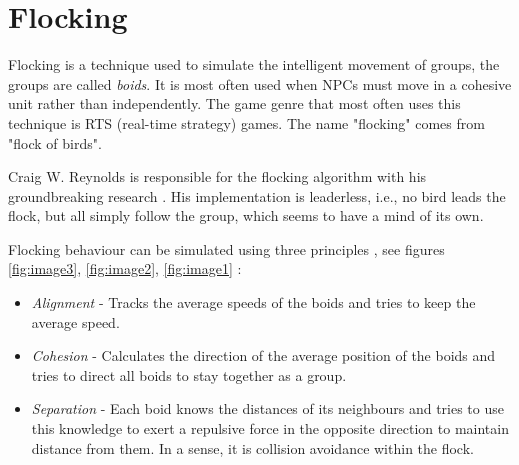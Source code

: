 \documentclass[a4paper,12pt,openright]{book}
\begin{document}
\section{Flocking}

Flocking is a technique used to simulate the intelligent movement of groups, the groups are called \emph{boids}. It is most often used when NPCs must move in a cohesive unit rather than independently. The game genre that most often uses this technique is RTS (real-time strategy) games. The name "flocking" comes from "flock of birds".

Craig W. Reynolds is responsible for the flocking algorithm with his groundbreaking research \cite{FlocksReynolds}. His implementation is leaderless, i.e., no bird leads the flock, but all simply follow the group, which seems to have a mind of its own.

Flocking behaviour can be simulated using three principles \cite{FlockingBehaviour}, see figures \ref{fig:image3}, \ref{fig:image2}, \ref{fig:image1} \cite{WebsiteBoids}: 
\begin{itemize} 
    \item \emph{Alignment} - Tracks the average speeds of the boids and tries to keep the average speed. 
    \item \emph{Cohesion} - Calculates the direction of the average position of the boids and tries to direct all boids to stay together as a group. 
    \item \emph{Separation} - Each boid knows the distances of its neighbours and tries to use this knowledge to exert a repulsive force in the opposite direction to maintain distance from them. In a sense, it is collision avoidance within the flock.
\end{itemize}
\end{document}
